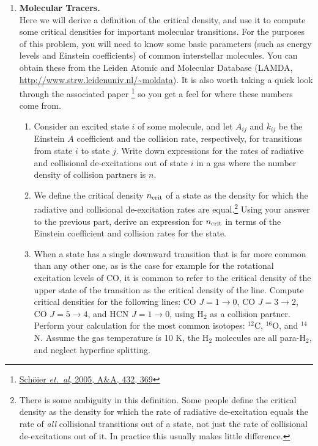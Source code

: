 \problemset

\begin{enumerate}

\item \textbf{Molecular Tracers.}\\
Here we will derive a definition of the critical density, and use it to compute some critical densities for important molecular transitions. For the purposes of this problem, you will need to know some basic parameters (such as energy levels and Einstein coefficients) of common interstellar molecules. You can obtain these from the Leiden Atomic and Molecular Database (LAMDA, \url{http://www.strw.leidenuniv.nl/~moldata}). It is also worth taking a quick look through the associated paper \citep{schoier05a}\footnote{\href{http://adsabs.harvard.edu/abs/2005A\%26A...432..369S}{Sch\"{o}ier {\it et.~al}, 2005, A\&A, 432, 369}} so you get a feel for where these numbers come from.
\begin{enumerate}
\item Consider an excited state $i$ of some molecule, and let $A_{ij}$ and $k_{ij}$ be the Einstein $A$ coefficient and the collision rate, respectively, for transitions from state $i$ to state $j$. Write down expressions for the rates of radiative and collisional de-excitations out of state $i$ in a gas where the number density of collision partners is $n$.
\item We define the critical density $n_{\rm crit}$ of a state as the density for which the radiative and collisional de-excitation rates are equal.\footnote{There is some ambiguity in this definition. Some people define the critical density as the density for which the rate of radiative de-excitation equals the rate of {\it all} collisional transitions out of a state, not just the rate of collisional de-excitations out of it. In practice this usually makes little difference.} Using your answer to the previous part, derive an expression for $n_{\rm crit}$ in terms of the Einstein coefficient and collision rates for the state. 
\item When a state has a single downward transition that is far more common than any other one, as is the case for example for the rotational excitation levels of CO, it is common to refer to the critical density of the upper state of the transition as the critical density of the line. Compute critical densities for the following lines: CO $J=1\rightarrow 0$, CO $J=3\rightarrow 2$, CO $J=5\rightarrow 4$, and HCN $J=1\rightarrow 0$, using H$_2$ as a collision partner. Perform your calculation for the most common isotopes: $^{12}$C, $^{16}$O, and $^{14}$N. Assume the gas temperature is 10 K, the H$_2$ molecules are all para-H$_2$, and neglect hyperfine splitting.

\end{enumerate}
\end{enumerate}
